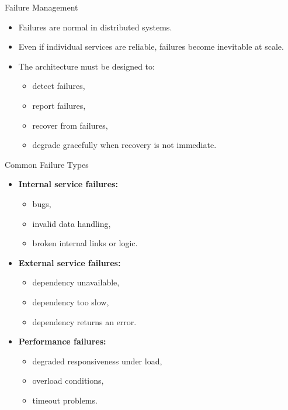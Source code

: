 \begin{frame}{Failure Management}
\begin{itemize}
    \item Failures are normal in distributed systems.
    \item Even if individual services are reliable, failures become inevitable at scale.
    \item The architecture must be designed to:
    \begin{itemize}
        \item detect failures,
        \item report failures,
        \item recover from failures,
        \item degrade gracefully when recovery is not immediate.
    \end{itemize}
\end{itemize}
\end{frame}

\begin{frame}{Common Failure Types}
\begin{itemize}
    \item \textbf{Internal service failures:}
    \begin{itemize}
        \item bugs,
        \item invalid data handling,
        \item broken internal links or logic.
    \end{itemize}
    \item \textbf{External service failures:}
    \begin{itemize}
        \item dependency unavailable,
        \item dependency too slow,
        \item dependency returns an error.
    \end{itemize}
    \item \textbf{Performance failures:}
    \begin{itemize}
        \item degraded responsiveness under load,
        \item overload conditions,
        \item timeout problems.
    \end{itemize}
\end{itemize}
\end{frame}

